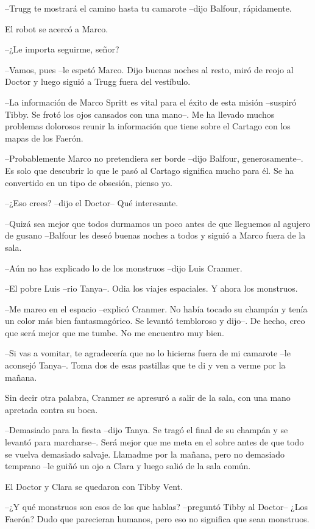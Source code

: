 {--Trugg te mostrará el camino hasta tu camarote --dijo Balfour,
rápidamente.}

{El robot se acercó a Marco.}

{--¿Le importa seguirme, señor?}

{--Vamos, pues --le espetó Marco. Dijo buenas noches al resto, miró de
reojo al Doctor y luego siguió a Trugg fuera del vestíbulo.}

{--La información de Marco Spritt es vital para el éxito de esta misión
 --suspiró Tibby. Se frotó los ojos cansados con una mano--. Me ha
 llevado muchos problemas dolorosos reunir la información que tiene sobre
el Cartago con los mapas de los Faerón.}

{--Probablemente Marco no pretendiera ser borde --dijo Balfour,
 generosamente--. Es solo que descubrir lo que le pasó al Cartago
 significa mucho para él. Se ha convertido en un tipo de obsesión, pienso
yo.}

{--¿Eso crees? --dijo el Doctor-- Qué interesante.}

{--Quizá sea mejor que todos durmamos un poco antes de que lleguemos al
 agujero de gusano --Balfour les deseó buenas noches a todos y siguió a
Marco fuera de la sala.}

{--Aún no has explicado lo de los monstruos --dijo Luis Cranmer.}

{--El pobre Luis --rio Tanya--. Odia los viajes espaciales. Y ahora los
monstruos.}

{--Me mareo en el espacio --explicó Cranmer. No había tocado su champán y
 tenía un color más bien fantasmagórico. Se levantó tembloroso y dijo--.
De hecho, creo que será mejor que me tumbe. No me encuentro muy bien.}

{--Si vas a vomitar, te agradecería que no lo hicieras fuera de mi
 camarote --le aconsejó Tanya--. Toma dos de esas pastillas que te di y
ven a verme por la mañana.}

{Sin decir otra palabra, Cranmer se apresuró a salir de la sala, con una
mano apretada contra su boca.}

{--Demasiado para la fiesta --dijo Tanya. Se tragó el final de su champán
 y se levantó para marcharse--. Será mejor que me meta en el sobre antes
 de que todo se vuelva demasiado salvaje. Llamadme por la mañana, pero no
 demasiado temprano --le guiñó un ojo a Clara y luego salió de la sala
común.}

{El Doctor y Clara se quedaron con Tibby Vent.}

{--¿Y qué monstruos son esos de los que hablas? --preguntó Tibby al
 Doctor-- ¿Los Faerón? Dudo que parecieran humanos, pero eso no significa
que sean monstruos.}

